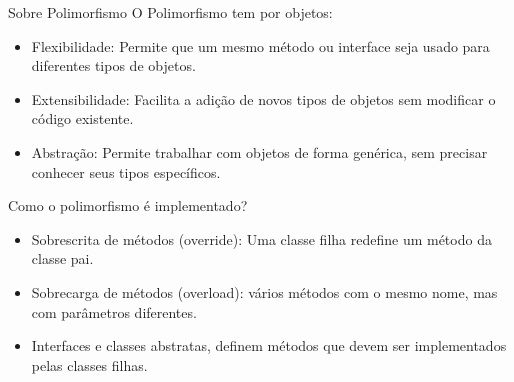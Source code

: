 \begin{frame}{Sobre Polimorfismo}
  O Polimorfismo tem por objetos:
  \begin{itemize}
    \item Flexibilidade: Permite que um mesmo método ou interface seja usado para diferentes tipos de objetos.
    \item Extensibilidade: Facilita a adição de novos tipos de objetos sem modificar o código existente.
    \item Abstração: Permite trabalhar com objetos de forma genérica, sem precisar conhecer seus tipos específicos.
  \end{itemize}
  \pause
  Como o polimorfismo é implementado?\pause
  \begin{itemize}
    \item Sobrescrita de métodos (override): Uma classe filha redefine um método da classe pai.
    \item Sobrecarga de métodos (overload): vários métodos com o mesmo nome, mas com parâmetros diferentes.
    \item Interfaces e classes abstratas, definem métodos que devem ser implementados pelas classes filhas.
  \end{itemize}
\end{frame}